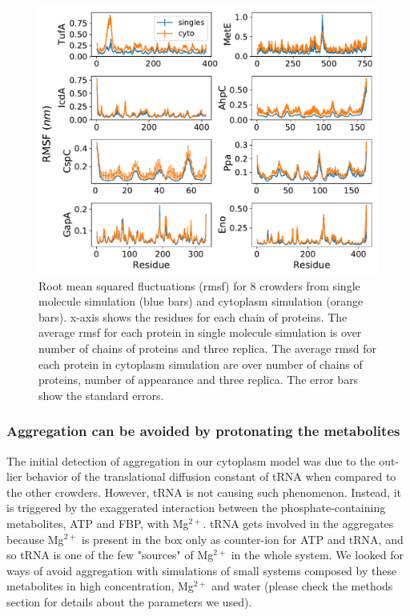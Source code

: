 \documentclass[journal=jacsat,manuscript=article]{achemso}
\begin{document}
\begin{figure}[H]
\includegraphics[scale=0.5]{rmsf.pdf}
\caption{Root mean squared fluctuations (rmsf) for 8 crowders from single molecule simulation (blue bars) and cytoplasm simulation (orange bars). x-axis shows the residues for each chain of proteins. The average rmsf for each protein in single molecule simulation is over number of chains of proteins and three replica. The average rmsd for each protein in cytoplasm simulation are over number of chains of proteins, number of appearance and three replica. The error bars show the standard errors.}
\label{fig:rmsf}
\end{figure}






\subsubsection{Aggregation can be avoided by protonating the metabolites}

The initial detection of aggregation in our cytoplasm model was due to the out-lier behavior of the translational diffusion constant of tRNA when compared to the other crowders. However, tRNA is not causing such phenomenon. Instead, it is triggered by the exaggerated interaction between the phosphate-containing metabolites, ATP and FBP, with Mg$^{2+}$. tRNA gets involved in the aggregates because Mg$^{2+}$ is present in the box only as counter-ion for ATP and tRNA, and so tRNA is one of the few "sources" of Mg$^{2+}$ in the whole system. We looked for ways of avoid aggregation with simulations of small systems composed by these metabolites in high concentration, Mg$^{2+}$ and water (please check the methods section for details about the parameters we used).
\end{document}
